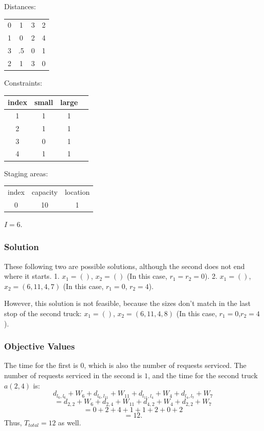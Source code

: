 \documentclass{article}
\begin{document}
Distances:

\begin{tabular} { c c c c }
0  & 1  & 3 & 2 \\
1  & 0  & 2 & 4 \\
3  & .5 & 0 & 1 \\
2  & 1  & 3 & 0 \\
\end{tabular}

Constraints:

\begin{tabular} {c | c   c   c }
index     &    small   &   large \\
\hline
  1       &    1       &      1 \\
  2       &    1       &      1 \\
  3       &    0       &      1 \\
  4       &    1       &      1 \\
\end{tabular}

Staging areas:

\begin{tabular} {c c c }
index     &   capacity & location \\
 0        &     10     &    1     \\
\end{tabular}

$I = 6$.


\subsubsection{Solution}

These following two are possible solutions, although the second does not end where it starts.
1. $x_1 = ()$, $x_2 = ()$ (In this case, $r_1 = r_2 = 0$).
2. $x_1 = ()$, $x_2 = (6, 11, 4, 7)$ (In this case, $r_1 = 0$, $r_2 = 4$).

However, this solution is not feasible, because the sizes don't match in the last stop of the second truck:
$x_1 = ()$, $x_2 = (6, 11, 4, 8)$ (In this case, $r_1 = 0$,$ r_2 = 4$).

\subsubsection{Objective Values}

The time for the first is $0$, which is also the number of requests serviced.
The number of requests serviced in the second is $1$, and the time for the second truck $a(2, 4)$ is:
$$d_{l_6,l_6} + W_6 + d_{l_6,l_{11}} + W_{11} + d_{l_{11}, l_4} + W_{4} + d_{l_4,l_7} + W_7$$
$$ = d_{2,2} + W_6 + d_{2,4} + W_{11} + d_{4, 2} + W_{4} + d_{2,2} + W_7$$
$$ = 0 + 2 + 4 + 1 + 1 + 2 + 0 + 2 $$
$$ = 12. $$
Thus, $T_{total} = 12$ as well.
\end{document}
